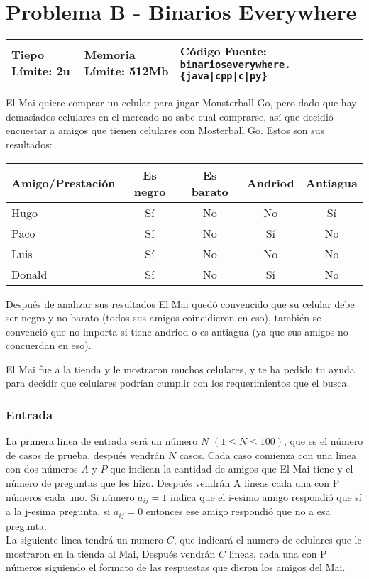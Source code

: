\chapter*{Problema B - Binarios Everywhere}

\begin{center}
  \begin{tabular}{ | l | l | l | }
    \hline
    Tiepo Límite: 2u & Memoria Límite: 512Mb & Código Fuente: \texttt{binarioseverywhere.\{java|cpp|c|py\}} \\
    \hline
  \end{tabular}
\end{center}

El Mai quiere comprar un celular para jugar Monsterball Go, pero dado que hay demasiados celulares en el mercado no sabe cual comprarse, así que decidió encuestar a amigos que tienen celulares con Mosterball Go. Estos son sus resultados:

\begin{center}
\begin{tabular}{l|cccc}
Amigo/Prestación   & Es negro & Es barato & Andriod & Antiagua \\
\hline
Hugo    & Sí & No & No & Sí \\
Paco    & Sí & No & Sí & No \\
Luis    & Sí & No & No & No \\
Donald  & Sí & No & Sí & No \\
\end{tabular}
\end{center}

Después de analizar sus resultados El Mai quedó convencido que su celular debe ser negro y no barato (todos sus amigos coincidieron en eso), también se convenció que no importa si tiene andriod o es antiagua (ya que sus amigos no concuerdan en eso).

El Mai fue a la tienda y le mostraron muchos celulares, y te ha pedido tu ayuda para decidir que celulares podrían cumplir con los requerimientos que el busca.
\subsection*{Entrada}

La primera línea de entrada será un número $N$ $(1 \leq  N\leq 100)$, que es el número de casos de prueba, después vendrán $N$ casos. Cada caso comienza con una linea con dos números $A$ y $P$ que indican la cantidad de amigos que El Mai tiene y el número de preguntas que les hizo. Después vendrán A lineas cada una con P números cada uno. Si número $a_{ij}=1$ indica que el i-esimo amigo respondió que sí a la j-esima pregunta, si $a_{ij}=0$ entonces ese amigo respondió que no a esa pregunta. \\
La siguiente linea tendrá un numero $C$, que indicará el numero de celulares que le mostraron en la tienda al Mai, Después vendrán $C$ lineas, cada una con P números siguiendo el formato de las respuestas que dieron los amigos del Mai.

